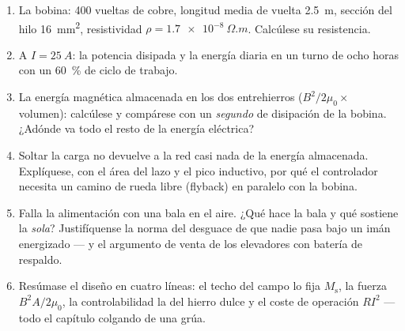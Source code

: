 \begin{problem}
\begin{enumerate}[resume]
  \item La bobina: 400 vueltas de cobre, longitud media de vuelta
        \qty{2.5}{m}, sección del hilo \qty{16}{mm^2}, resistividad
        $\rho = \qty{1.7e-8}{\Omega.m}$. Calcúlese su resistencia.
  \item A $I = \qty{25}{A}$: la potencia disipada y la energía
        diaria en un turno de ocho horas con un \qty{60}{\percent} de ciclo de trabajo.
  \item La energía magnética almacenada en los dos entrehierros
        ($B^2/2\mu_0 \times$ volumen): calcúlese y compárese con
        un \emph{segundo} de disipación de la bobina. ¿Adónde va todo
        el resto de la energía eléctrica?
  \item Soltar la carga no devuelve a la red casi nada de la energía
        almacenada. Explíquese, con el área del lazo y el
        pico inductivo, por qué el controlador necesita un camino de
        rueda libre (flyback) en paralelo con la bobina.
  \item Falla la alimentación con una bala en el aire. ¿Qué hace la bala
        y qué sostiene la  \emph{sola}? Justifíquense
        la norma del desguace de que nadie pasa bajo un imán energizado ---
        y el argumento de venta de los elevadores con batería de respaldo.
  \item Resúmase el diseño en cuatro líneas: el techo del campo lo fija
        $M_{\text{s}}$, la fuerza $B^2A/2\mu_0$, la controlabilidad la
         del hierro dulce y el coste de operación $RI^2$ --- todo
        el capítulo colgando de una grúa.
\end{enumerate}
\end{problem}
